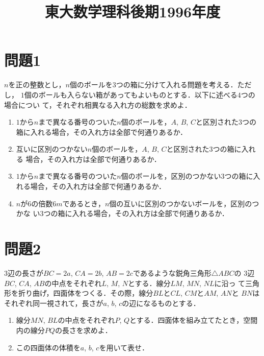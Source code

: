 \documentclass[unicode,12pt, A4j]{ltjsarticle}%
\title{東大数学理科後期1996年度}
\author{}
\date{}
\begin{document}
\maketitle

\section{問題1}
$n$を正の整数とし，$n$個のボールを$3$つの箱に分けて入れる問題を考える．ただし，
$1$個のボールも入らない箱があってもよいものとする．以下に述べる$4$つの場合につい
て，それぞれ相異なる入れ方の総数を求めよ．

\begin{enumerate}
\item $1$から$n$まで異なる番号のついた$n$個のボールを，$A$, $B$, $C$と区別された$3$つの
箱に入れる場合，その入れ方は全部で何通りあるか．

\item 互いに区別のつかない$n$個のボールを，$A$, $B$, $C$と区別された$3$つの箱に入れる
場合，その入れ方は全部で何通りあるか．

\item $1$から$n$まで異なる番号のついた$n$個のボールを，区別のつかない$3$つの箱に入
れる場合，その入れ方は全部で何通りあるか．

\item $n$が$6$の倍数$6m$であるとき，$n$個の互いに区別のつかないボールを，区別のつかな
い$3$つの箱に入れる場合，その入れ方は全部で何通りあるか．
\end{enumerate}

\section{問題2}
$3$辺の長さが$BC = 2a$, $CA = 2b$, $AB = 2c$であるような鋭角三角形$\triangle ABC$の
$3$辺$BC$, $CA$, $AB$の中点をそれぞれ$L$, $M$, $N$とする．線分$LM$, $MN$, $NL$に沿っ
て三角形を折り曲げ，四面体をつくる．その際，線分$BL$と$CL$, $CM$と$AM$, $AN$と
$BN$はそれぞれ同一視されて，長さが$a$, $b$, $c$の辺になるものとする．

\begin{enumerate}
\item 線分$MN$, $BL$の中点をそれぞれ$P$, $Q$とする．四面体を組み立てたとき，空間
内の線分$PQ$の長さを求めよ．

\item この四面体の体積を$a$, $b$, $c$を用いて表せ．
\end{enumerate}
\end{document}
